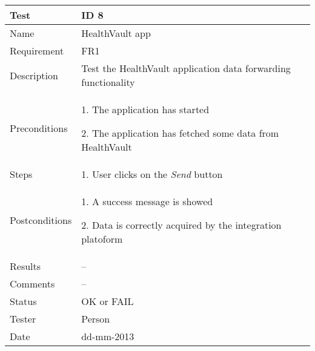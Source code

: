 \begin{table}
\begin{center}
\begin{tabular}{ | l | p{10cm} | }
	\hline
	\textbf{Test}	&	\textbf{ID 8} \\
	\hline\noalign{\smallskip}\noalign{\smallskip}\hline
	Name				& HealthVault app \\
	Requirement			& FR1 \\
	Description			& Test the HealthVault application data forwarding functionality \\
	Preconditions		&	\par 1. The application has started
							\par 2. The application has fetched some data from HealthVault \\
	Steps 				&	\par 1. User clicks on the \textit{Send} button \\
	Postconditions		&	\par 1. A success message is showed
							\par 2. Data is correctly acquired by the integration platoform \\
	Results				& -- \\
	Comments			& -- \\
	Status				& OK or FAIL \\
	Tester				& Person \\
	Date				& dd-mm-2013 \\
	\hline
\end{tabular}
\end{center}
\end{table}